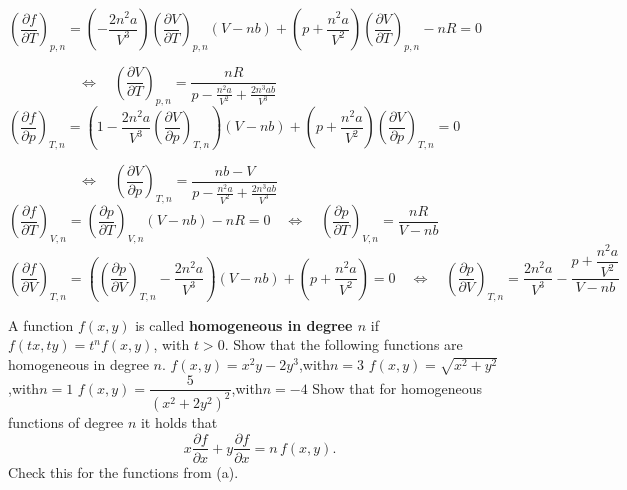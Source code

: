 \begin{Answer}

    \Question $\left(\dfrac{\partial f}{\partial T}\right)_{p,n} = \left(-\dfrac{2n^2a}{V^3}\right) \left(\dfrac{\partial V}{\partial T}\right)_{p,n}(V-nb) + \left( p+\dfrac{n^2a}{V^2}\right)\left(\dfrac{\partial V}{\partial T}\right)_{p,n} - nR = 0$
    
     $\qquad\qquad\quad\Leftrightarrow\quad \left(\dfrac{\partial V}{\partial T}\right)_{p,n} = \dfrac{nR}{p-\frac{n^2a}{V^2}+\frac{2n^3ab}{V^3}}$
    \Question $\left(\dfrac{\partial f}{\partial p}\right)_{T,n} = \left(1-\dfrac{2n^2a}{V^3}\left(\dfrac{\partial V}{\partial p}\right)_{T,n}\right)(V-nb) + \left( p+\dfrac{n^2a}{V^2}\right)\left(\dfrac{\partial V}{\partial p}\right)_{T,n} = 0$
    
     $\qquad\qquad\quad\Leftrightarrow\quad \left(\dfrac{\partial V}{\partial p}\right)_{T,n} = \dfrac{nb-V}{p-\frac{n^2a}{V^2}+\frac{2n^3ab}{V^3}}$
    \Question $\left(\dfrac{\partial f}{\partial T}\right)_{V,n} = \left(\dfrac{\partial p}{\partial T}\right)_{V,n}(V-nb)-nR = 0 \quad\Leftrightarrow\quad \left(\dfrac{\partial p}{\partial T}\right)_{V,n} = \dfrac{nR}{V-nb} $
    \Question $\left(\dfrac{\partial f}{\partial V}\right)_{T,n} = \left( \left(\dfrac{\partial p}{\partial V}\right)_{T,n} - \dfrac{2n^2a}{V^3}\right)(V-nb) + \left(p+\dfrac{n^2a}{V^2}\right) = 0 \quad\Leftrightarrow\quad  \left(\dfrac{\partial p}{\partial V}\right)_{T,n} = \dfrac{2n^2a}{V^3} - \dfrac{p+\dfrac{n^2a}{V^2}}{V-nb}$
    
\end{Answer}

\ifanalysis
\begin{Exercise}[difficulty = 2] A function $f(x,y)$ is called \textbf{homogeneous in degree $n$} if $f(tx,ty) = t^nf(x,y)$, with $t>0$.
    \Question Show that the following functions are homogeneous in degree $n$.
        \subQuestion $f(x,y) = x^2y-2y^3$,\qquad with\quad $n=3$
        \subQuestion $f(x,y) = \sqrt{x^2+y^2}$,\qquad with\quad $n=1$
        \subQuestion $f(x,y) = \dfrac{5}{(x^2+2y^2)^2}$,\qquad with\quad $n=-4$
    \Question Show that for homogeneous functions of degree $n$ it holds that
    \[x\dfrac{\partial f}{\partial x} + y\dfrac{\partial f}{\partial x} = n\, f(x,y).\]
    Check this for the functions from (a).
\end{Exercise}

